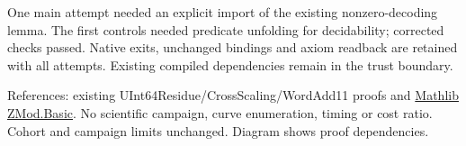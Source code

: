 \documentclass[10pt]{article}
\begin{document}
One main attempt needed an explicit import of the existing nonzero-decoding lemma. The first controls needed predicate unfolding for decidability; corrected checks passed. Native exits, unchanged bindings and axiom readback are retained with all attempts. Existing compiled dependencies remain in the trust boundary.

References: existing UInt64Residue/CrossScaling/WordAdd11 proofs and \href{https://leanprover-community.github.io/mathlib4_docs/Mathlib/Data/ZMod/Basic.html}{Mathlib ZMod.Basic}. No scientific campaign, curve enumeration, timing or cost ratio. Cohort and campaign limits unchanged. Diagram shows proof dependencies.
\end{document}
